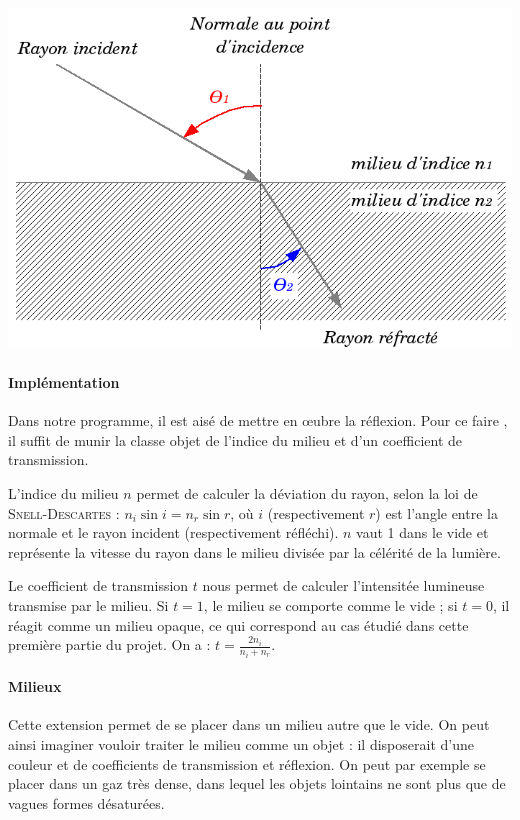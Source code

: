 \documentclass{article}
\begin{document}
\begin{center}
  \includegraphics[scale=0.5]{img/refraction.png}
\end{center}

\paragraph{Implémentation}
Dans notre programme, il est aisé de mettre en œubre la réflexion. Pour ce faire
, il suffit de munir la classe objet de l'indice du milieu et d'un coefficient
de transmission.

L'indice du milieu $n$ permet de calculer la déviation du rayon, selon la loi de
\textsc{Snell-Descartes} : $n_i \sin i = n_r \sin r$, où $i$ (respectivement $r$)
est l'angle entre la normale et le rayon incident (respectivement réfléchi). $n$
vaut 1 dans le vide et représente la vitesse du rayon dans le milieu divisée par
la célérité de la lumière.

Le coefficient de transmission $t$ nous permet de calculer l'intensitée lumineuse
transmise par le milieu. Si $t=1$, le milieu se comporte comme le vide ; si $t=0$,
il réagit comme un milieu opaque, ce qui correspond au cas étudié dans cette
première partie du projet. On a : $t=\frac{2n_i}{n_i + n_r}$.

\paragraph{Milieux}
Cette extension permet de se placer dans un milieu autre que le vide. On peut
ainsi imaginer vouloir traiter le milieu comme un objet : il disposerait d'une
couleur et de coefficients de transmission et réflexion. On peut par exemple se
placer dans un gaz très dense, dans lequel les objets lointains ne sont plus que
de vagues formes désaturées.
\end{document}
